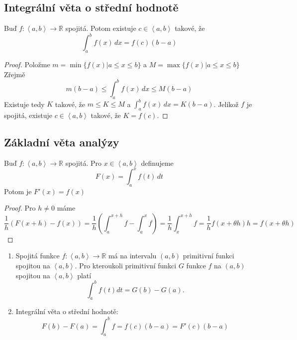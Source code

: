 \documentclass[../main.tex]{subfiles}
\begin{document}
\subsection{Integrální věta o střední hodnotě}
\begin{theorem}
	Buď $f: \left< a,b \right> \to \mathbb{R}$ spojitá. Potom existuje $c \in \left< a,b \right>$
	takové, že
	\[ \int_{a}^{b} f(x) \,dx = f(c)(b-a)\]
\end{theorem}

\begin{proof}
	Položme $m = \min \{ f(x)|a \leq x \leq b \}$ a $M = \max \{ f(x)|a \leq x \leq b \} $
	Zřejmě
	\[ m(b-a) \leq \int_{a}^{b} f(x) \,dx \leq M(b-a) \]
	Existuje tedy $K$ takové, že $m \leq K \leq M$ a $\int_{a}^{b} f(x) \,dx = K(b-a)$.
	Jelikož $f$ je spojitá, existuje $c \in \left< a,b \right>$ takové, že $K = f(c)$.
\end{proof}

\subsection{Základní věta analýzy}
\begin{theorem}
	Buď $f: \left< a,b \right> \to \mathbb{R}$ spojitá. Pro $x \in \left< a,b \right>$ definujeme
	\[ F(x) = \int_{a}^{x} f(t) \,dt \]
	Potom je $F'(x) = f(x)$
\end{theorem}

\begin{proof}
	Pro $h\neq 0$ máme
	\[ \frac{1}{h}(F(x+h) - f(x)) =\frac{1}{h}\left( \int_{a}^{x+h} f - \int_{a}^{x} f \right) =
	\frac{1}{h} \int_{x}^{x+h} f = \frac{1}{h}f(x + \theta h)h = f(x + \theta h) \]
\end{proof}

\begin{consequence}
	\hfill
	\begin{enumerate}
	    \item Spojitá funkce $f : \left<a,b\right> \rightarrow \mathbb{R}$ má na intervalu $(a,b)$ primitivní funkci spojitou na $\left<a,b\right>$.
	          Pro kteroukoli primitivní funkci $G$ funkce $f$ na $(a,b)$ spojitou na $\left<a,b\right>$ platí
	          \[\int^b_a f(t)dt = G(b) - G(a).\]
	    \item Integrální věta o střední hodnotě:
	    \[F(b) - F(a) = \int^b_a f = f(c)(b-a) = F'(c)(b-a)\]
	\end{enumerate}
\end{consequence}
\end{document}
